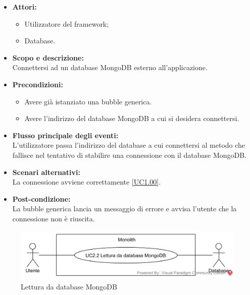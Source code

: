 \begin{itemize}
	\item \textbf{Attori:}
	\begin{itemize}
		\item Utilizzatore del framework;
		\item Database.
	\end{itemize}
	\item \textbf{Scopo e descrizione:} 
	\\Connettersi ad un database MongoDB esterno all'applicazione.
	\item \textbf{Precondizioni:}
	\begin{itemize}
		\item Avere già istanziato una bubble generica.
		\item Avere l'indirizzo del database MongoDB a cui si desidera connettersi.
	\end{itemize}
	\item \textbf{Flusso principale degli eventi:}
	\\L'utilizzatore passa l'indirizzo del database a cui connettersi al metodo che fallisce nel tentativo di stabilire una connessione con il database MongoDB.
	\item \textbf{Scenari alternativi:}
	\\La connessione avviene correttamente \ref{UC1.00}.
	\item \textbf{Post-condizione:}
	\\La bubble generica lancia un messaggio di errore e avvisa l'utente che la connessione non è riuscita.
\end{itemize}

\begin{samepage}
\nopagebreak	
\begin{figure}[H]
	\centering
	\includegraphics[width=15cm]{../../documenti/AnalisiDeiRequisiti/Diagrammi_img/usecase/uc1_01.png}
	\caption{\UCFCaption{} Lettura da database MongoDB}
\end{figure}
\end{samepage}

